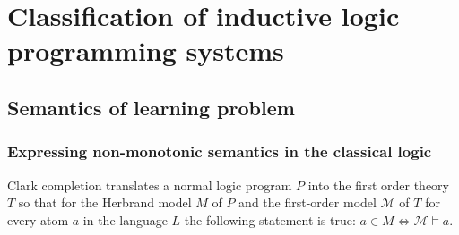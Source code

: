 \chapter{Classification of inductive logic programming systems}
\section{Semantics of learning problem}
\subsection{Expressing non-monotonic semantics in the classical logic}
Clark completion translates a normal logic program $P$ into the first order theory $T$ so that for the Herbrand model $M$ of $P$ and the first-order model $\mathcal{M}$ of $T$ for every atom $a$ in the language $L$ the following statement is true:
$a \in M \iff \mathcal{M} \models a$.